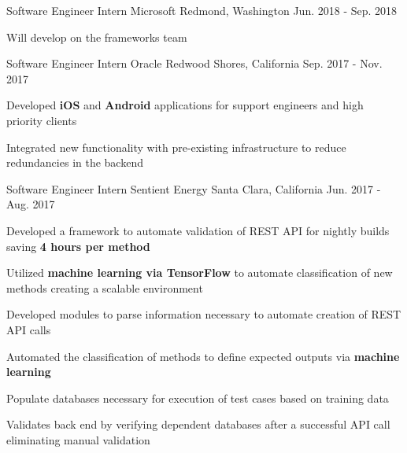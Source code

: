 


\begin{cventries}

\cventry
{Software Engineer Intern}
{Microsoft}
{Redmond, Washington}
{Jun. 2018 - Sep. 2018}
{
\begin{cvitems}
\item {Will develop on the frameworks team}
\end{cvitems}
}
\cventry
{Software Engineer Intern} %
{Oracle} %
{Redwood Shores, California} %
{Sep. 2017 - Nov. 2017} %
{
\begin{cvitems}
\item {Developed \textbf{iOS} and \textbf{Android} applications for support engineers and high priority clients}
\item {Integrated new functionality with pre-existing infrastructure to reduce redundancies in the backend}
\end{cvitems}
}

\cventry
{Software Engineer Intern} %
{Sentient Energy} %
{Santa Clara, California} %
{Jun. 2017 - Aug. 2017} %
{ %
\begin{cvitems}
\item {Developed a framework to automate validation of REST API for nightly builds saving \textbf{4 hours per method}}
\item {Utilized \textbf{machine learning via TensorFlow} to automate classification of new methods creating a scalable environment}
\item {Developed modules to parse information necessary to automate creation of REST API calls}
\item {Automated the classification of methods to define expected outputs via \textbf{machine learning}}
\item {Populate databases necessary for execution of test cases based on training data}
\item {Validates back end by verifying dependent databases after a successful API call eliminating manual validation}
\end{cvitems}
}


\end{cventries}
